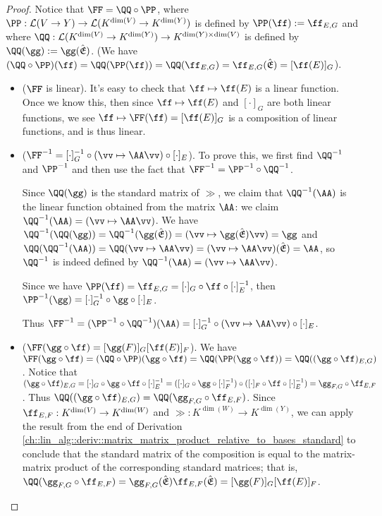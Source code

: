 \begin{proof}   
    Notice that $\FF = \QQ \circ \PP$, where ${\PP:\LLLL(V \rightarrow Y) \rightarrow \LLLL(K^{\dim(V)} \rightarrow K^{\dim(Y)})}$ is defined by $\PP(\ff) := \ff_{E,G}$ and where ${\QQ:\LLLL(K^{\dim(V)} \rightarrow K^{\dim(Y)}) \rightarrow K^{\dim(Y) \times \dim(V)}}$ is defined by $\QQ(\gg) := \gg(\sE)$. (We have $(\QQ \circ \PP)(\ff) = \QQ(\PP(\ff)) = \QQ(\ff_{E,G}) = \ff_{E,G}(\sE) = [\ff(E)]_G$). 

    \begin{itemize}    
        \item ($\FF$ is linear). It's easy to check that $\ff \mapsto \ff(E)$ is a linear function. Once we know this, then since $\ff \mapsto \ff(E)$ and $[\cdot]_G$ are both linear functions, we see $\ff \mapsto \FF(\ff) = [\ff(E)]_G$ is a composition of linear functions, and is thus linear.
        
        \item ($\FF^{-1} = [\cdot]_G^{-1} \circ (\vv \mapsto \AA \vv) \circ [\cdot]_E$). To prove this, we first find $\QQ^{-1}$ and $\PP^{-1}$ and then use the fact that $\FF^{-1} = \PP^{-1} \circ \QQ^{-1}$.
                
        Since $\QQ(\gg)$ is the standard matrix of $\gg$, we claim that $\QQ^{-1}(\AA)$ is the linear function obtained from the matrix $\AA$: we claim $\QQ^{-1}(\AA) = (\vv \mapsto \AA \vv)$. We have $\QQ^{-1}(\QQ(\gg)) = \QQ^{-1}(\gg(\sE)) = (\vv \mapsto \gg(\sE) \vv) = \gg$ and $\QQ(\QQ^{-1}(\AA)) = \QQ(\vv \mapsto \AA \vv) = (\vv \mapsto \AA \vv)(\sE) = \AA$, so $\QQ^{-1}$ is indeed defined by $\QQ^{-1}(\AA) = (\vv \mapsto \AA \vv)$.

        Since we have $\PP(\ff) = \ff_{E,G} = [\cdot]_G \circ \ff \circ [\cdot]_E^{-1}$, then $\PP^{-1}(\gg) = [\cdot]_G^{-1} \circ \gg \circ [\cdot]_E$.

        Thus $\FF^{-1} = (\PP^{-1} \circ \QQ^{-1})(\AA) = [\cdot]_G^{-1} \circ (\vv \mapsto \AA \vv) \circ [\cdot]_E$.
        
        \item ($\FF(\gg \circ \ff) = [\gg(F)]_G [\ff(E)]_F$). We have $\FF(\gg \circ \ff) = (\QQ \circ \PP)(\gg \circ \ff) = \QQ(\PP(\gg \circ \ff)) = \QQ((\gg \circ \ff)_{E,G})$. Notice that $(\gg \circ \ff)_{E,G} = [\cdot]_G \circ \gg \circ \ff \circ [\cdot]_E^{-1} = ([\cdot]_G \circ \gg \circ [\cdot]_F^{-1}) \circ ([\cdot]_F \circ \ff \circ [\cdot]_E^{-1}) = \gg_{F,G} \circ \ff_{E,F}$. Thus $\QQ((\gg \circ \ff)_{E,G}) = \QQ(\gg_{F,G} \circ \ff_{E,F})$. Since $\ff_{E,F}:K^{\dim(V)} \rightarrow K^{\dim(W)}$ and $\gg:K^{\dim(W)} \rightarrow K^{\dim(Y)}$, we can apply the result from the end of Derivation \ref{ch::lin_alg::deriv::matrix_matrix_product_relative_to_bases_standard} to conclude that the standard matrix of the composition is equal to the matrix-matrix product of the corresponding standard matrices; that is, $\QQ(\gg_{F,G} \circ \ff_{E,F}) = \gg_{F,G}(\sE) \ff_{E,F}(\sE) = [\gg(F)]_G [\ff(E)]_F$.


\end{itemize}
\end{proof}
